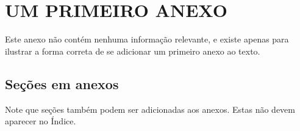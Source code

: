 \chapter{UM PRIMEIRO ANEXO}
Este anexo não contém nenhuma informação relevante, e existe apenas para ilustrar a forma correta de se adicionar um primeiro anexo ao texto.

\section{Seções em anexos}
Note que seções também podem ser adicionadas aos anexos. Estas não devem aparecer no Índice.